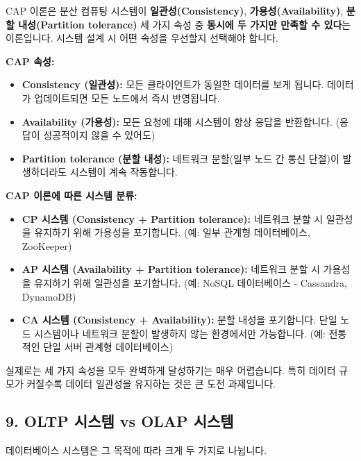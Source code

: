 \documentclass[11pt,a4paper]{article}
\theoremstyle{definition}
\begin{document}
\begin{summarybox}
CAP 이론은 분산 컴퓨팅 시스템이 \textbf{일관성(Consistency)}, \textbf{가용성(Availability)}, \textbf{분할 내성(Partition tolerance)} 세 가지 속성 중 \textbf{동시에 두 가지만 만족할 수 있다}는 이론입니다. 시스템 설계 시 어떤 속성을 우선할지 선택해야 합니다.
\end{summarybox}

\textbf{CAP 속성:}
\begin{itemize}
    \item \textbf{Consistency (일관성):} 모든 클라이언트가 동일한 데이터를 보게 됩니다. 데이터가 업데이트되면 모든 노드에서 즉시 반영됩니다.
    \item \textbf{Availability (가용성):} 모든 요청에 대해 시스템이 항상 응답을 반환합니다. (응답이 성공적이지 않을 수 있어도)
    \item \textbf{Partition tolerance (분할 내성):} 네트워크 분할(일부 노드 간 통신 단절)이 발생하더라도 시스템이 계속 작동합니다.
\end{itemize}

\textbf{CAP 이론에 따른 시스템 분류:}
\begin{itemize}
    \item \textbf{CP 시스템 (Consistency + Partition tolerance):} 네트워크 분할 시 일관성을 유지하기 위해 가용성을 포기합니다. (예: 일부 관계형 데이터베이스, ZooKeeper)
    \item \textbf{AP 시스템 (Availability + Partition tolerance):} 네트워크 분할 시 가용성을 유지하기 위해 일관성을 포기합니다. (예: NoSQL 데이터베이스 - Cassandra, DynamoDB)
    \item \textbf{CA 시스템 (Consistency + Availability):} 분할 내성을 포기합니다. 단일 노드 시스템이나 네트워크 분할이 발생하지 않는 환경에서만 가능합니다. (예: 전통적인 단일 서버 관계형 데이터베이스)
\end{itemize}

\begin{warningbox}
실제로는 세 가지 속성을 모두 완벽하게 달성하기는 매우 어렵습니다. 특히 데이터 규모가 커질수록 데이터 일관성을 유지하는 것은 큰 도전 과제입니다.
\end{warningbox}

\subsection*{9. OLTP 시스템 vs OLAP 시스템}

데이터베이스 시스템은 그 목적에 따라 크게 두 가지로 나뉩니다.
\end{document}
